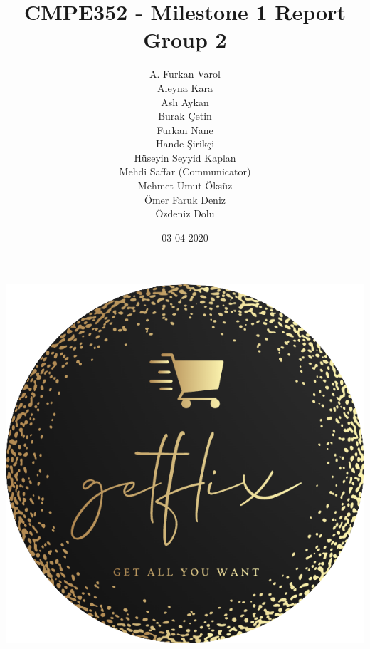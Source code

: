 \documentclass[]{article}
\title{CMPE352 - Milestone 1 Report \\ Group 2}
\author{A. Furkan Varol \\ Aleyna Kara \\ Aslı Aykan
    \\ Burak Çetin \\ Furkan Nane \\ Hande Şirikçi
    \\ Hüseyin Seyyid Kaplan \\ Mehdi Saffar (Communicator) \\ Mehmet Umut Öksüz
    \\ Ömer Faruk Deniz \\ Özdeniz Dolu}
\date{03-04-2020}
\begin{document}
\makeatletter
\begin{titlepage}
    \begin{center}
        \includegraphics{logo_circle.png}\\[3ex] \leavevmode \\
        {\huge \bfseries \@title}\\[2ex] 
        {\large \@author}\\[2ex]
        {\large \@date}
    \end{center}
\end{titlepage}
\makeatother
\thispagestyle{empty}
\newpage

{
    \setcounter{tocdepth}{2}
    \tableofcontents
    \pagebreak
}


\end{document}
